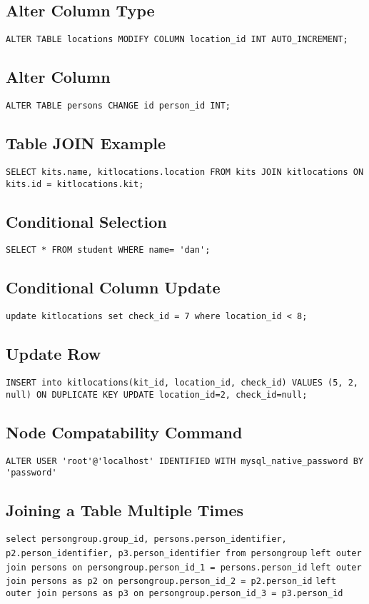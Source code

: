 \documentclass{article}
\begin{document}
\begin{multicols}{3}
\subsection{Alter Column Type}
\lstinline|ALTER TABLE locations MODIFY COLUMN location_id INT AUTO_INCREMENT;|

\subsection{Alter Column}
\lstinline|ALTER TABLE persons CHANGE id person_id INT;|

\subsection{Table JOIN Example}
\lstinline|SELECT kits.name, kitlocations.location FROM kits JOIN kitlocations ON kits.id = kitlocations.kit;|

\subsection{Conditional Selection}
\lstinline|SELECT * FROM student WHERE name= 'dan';|

\subsection{Conditional Column Update}
\lstinline|update kitlocations set check_id = 7 where location_id < 8;|

\subsection{Update Row}
\lstinline|INSERT into kitlocations(kit_id, location_id, check_id) VALUES (5, 2, null) ON DUPLICATE KEY UPDATE location_id=2, check_id=null;|

\subsection{Node Compatability Command}
\lstinline|ALTER USER 'root'@'localhost' IDENTIFIED WITH mysql_native_password BY 'password'|

\subsection{Joining a Table Multiple Times}
\lstinline|select persongroup.group_id, persons.person_identifier, p2.person_identifier, p3.person_identifier from persongroup|
\lstinline|left outer join persons on persongroup.person_id_1 = persons.person_id|
\lstinline|left outer join persons as p2 on persongroup.person_id_2 = p2.person_id|
\lstinline|left outer join persons as p3 on persongroup.person_id_3 = p3.person_id|
\end{multicols}
\end{document}
